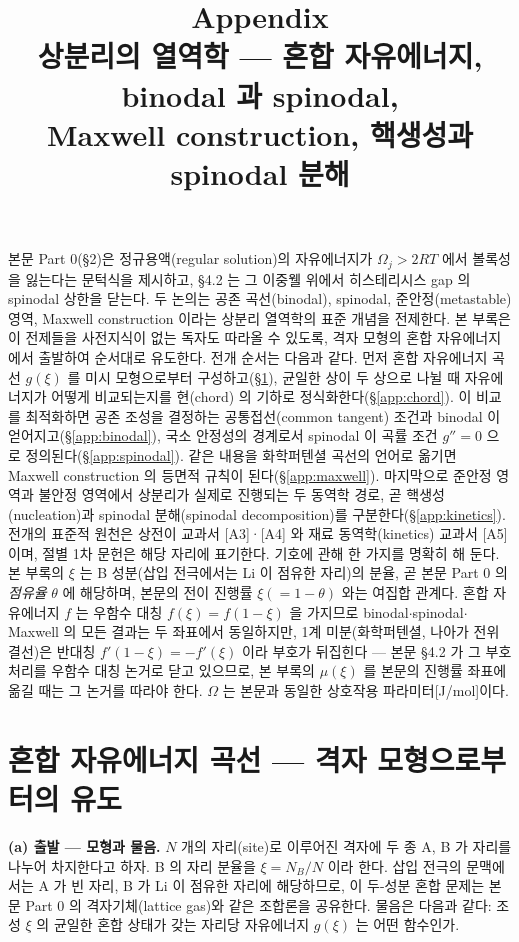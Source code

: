 \documentclass[11pt,a4paper]{article}
\title{\textbf{\LARGE Appendix}\\[0.35em]\Large 상분리의 열역학 --- 혼합 자유에너지, binodal 과 spinodal,\\ Maxwell construction, 핵생성과 spinodal 분해}
\author{}
\date{}
\begin{document}
\maketitle

본문 Part 0(\S2)은 정규용액(regular solution)의 자유에너지가 $\Omega_j>2RT$ 에서 볼록성을 잃는다는
문턱식을 제시하고, \S4.2 는 그 이중웰 위에서 히스테리시스 gap 의 spinodal 상한을 닫는다. 두 논의는
공존 곡선(binodal), spinodal, 준안정(metastable) 영역, Maxwell construction 이라는 상분리 열역학의
표준 개념을 전제한다. 본 부록은 이 전제들을 사전지식이 없는 독자도 따라올 수 있도록, 격자 모형의
혼합 자유에너지에서 출발하여 순서대로 유도한다. 전개 순서는 다음과 같다. 먼저 혼합 자유에너지
곡선 $g(\xi)$ 를 미시 모형으로부터 구성하고(\S\ref{app:mixfe}), 균일한 상이 두 상으로 나뉠 때
자유에너지가 어떻게 비교되는지를 현(chord) 의 기하로 정식화한다(\S\ref{app:chord}). 이 비교를
최적화하면 공존 조성을 결정하는 공통접선(common tangent) 조건과 binodal 이 얻어지고(\S\ref{app:binodal}),
국소 안정성의 경계로서 spinodal 이 곡률 조건 $g''=0$ 으로 정의된다(\S\ref{app:spinodal}).
같은 내용을 화학퍼텐셜 곡선의 언어로 옮기면 Maxwell construction 의 등면적 규칙이
된다(\S\ref{app:maxwell}). 마지막으로 준안정 영역과 불안정 영역에서 상분리가 실제로 진행되는 두
동역학 경로, 곧 핵생성(nucleation)과 spinodal 분해(spinodal decomposition)를
구분한다(\S\ref{app:kinetics}). 전개의 표준적 원천은 상전이 교과서 [A3]·[A4] 와 재료 동역학(kinetics) 교과서
[A5] 이며, 절별 1차 문헌은 해당 자리에 표기한다. 기호에 관해 한 가지를 명확히 해 둔다. 본 부록의 $\xi$ 는 B 성분(삽입
전극에서는 Li 이 점유한 자리)의 분율, 곧 본문 Part 0 의 \emph{점유율} $\theta$ 에 해당하며, 본문의 전이
진행률 $\xi(=1-\theta)$ 와는 여집합 관계다. 혼합 자유에너지 $f$ 는 우함수 대칭 $f(\xi)=f(1-\xi)$ 을
가지므로 binodal$\cdot$spinodal$\cdot$Maxwell 의 모든 결과는 두 좌표에서 동일하지만, 1계
미분(화학퍼텐셜, 나아가 전위 결선)은 반대칭 $f'(1-\xi)=-f'(\xi)$ 이라 부호가 뒤집힌다 --- 본문
\S4.2 가 그 부호 처리를 우함수 대칭 논거로 닫고 있으므로, 본 부록의 $\mu(\xi)$ 를 본문의 진행률 좌표에
옮길 때는 그 논거를 따라야 한다. $\Omega$ 는 본문과 동일한 상호작용 파라미터[J/mol]이다.

\section{혼합 자유에너지 곡선 --- 격자 모형으로부터의 유도}\label{app:mixfe}

\textbf{(a) 출발 --- 모형과 물음.} $N$ 개의 자리(site)로 이루어진 격자에 두 종 A, B 가 자리를 나누어
차지한다고 하자. B 의 자리 분율을 $\xi=N_B/N$ 이라 한다. 삽입 전극의 문맥에서는 A 가 빈 자리, B 가
Li 이 점유한 자리에 해당하므로, 이 두-성분 혼합 문제는 본문 Part 0 의 격자기체(lattice gas)와 같은
조합론을 공유한다. 물음은 다음과 같다: 조성 $\xi$ 의 균일한 혼합 상태가 갖는 자리당 자유에너지
$g(\xi)$ 는 어떤 함수인가.
\end{document}

